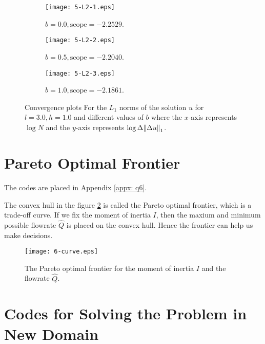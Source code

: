 \documentclass{assignment}[2019/10/15]
\begin{document}
    \begin{figure}[htb]
        \begin{subfigure}[b]{0.32\textwidth}
            \centering
            \texttt{[image: 5-L2-1.eps]}
            \caption{$b = 0.0, \text{scope} = -2.2529$.}
        \end{subfigure}
        \hfill
        \begin{subfigure}[b]{0.32\textwidth}
            \centering
            \texttt{[image: 5-L2-2.eps]}
            \caption{$b = 0.5, \text{scope} = -2.2040$.}
        \end{subfigure}
        \hfill
        \begin{subfigure}[b]{0.32\textwidth}
            \centering
            \texttt{[image: 5-L2-3.eps]}
            \caption{$b = 1.0, \text{scope} = -2.1861$.}
        \end{subfigure}
        \caption{Convergence plots For the $L_1$ norms of the solution $u$ for $l = 3.0, h = 1.0$ and different values of $b$ where the $x$-axis represents $\log N$ and the $y$-axis represents $\log \Delta \norm{\Delta u}_1$.}
        \label{fig: q5-L2}
    \end{figure}

    \section{Pareto Optimal Frontier}

    The codes are placed in Appendix \ref{appx: q6}.

    The convex hull in the figure \ref{fig: q6} is called the Pareto optimal frontier, which is a trade-off curve. If we fix the moment of inertia $I$, then the maxium and minimum possible flowrate $\hat Q$ is placed on the convex hull. Hence the frontier can help us make decisions.

    \begin{figure}[htb]
        \centering
        \texttt{[image: 6-curve.eps]}
        \caption{The Pareto optimal frontier for the moment of inertia $I$ and the flowrate $\hat Q$.}
        \label{fig: q6}
    \end{figure}

    \clearpage\appendix

    \section{Codes for Solving the Problem in New Domain}\label{appx: q3}
\end{document}
